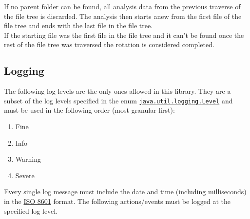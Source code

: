 \documentclass[11pt]{article} %
\begin{document}
    If no parent folder can be found, all analysis data from the previous traverse of the file tree is discarded. The analysis then starts anew from the first file of the file tree and ends with the last file in the file tree.\\
    If the starting file was the first file in the file tree and it can't be found once the rest of the file tree was traversed the rotation is considered completed.


    \subsection{Logging}\label{sec:3.3}

    The following log-levels are the only ones allowed in this library. They are a subset of the log levels specified in the enum \href{https://docs.oracle.com/javase/8/docs/api/java/util/logging/class-use/Level.html}{\texttt{java.util.logging.Level}} and must be used in the following order (most granular first):

    \begin{enumerate}
        \item Fine
        \item Info
        \item Warning
        \item Severe
    \end{enumerate}

    Every single log message must include the date and time (including milliseconds) in the \href{https://en.wikipedia.org/wiki/ISO_8601}{ISO 8601} format. The following actions/events must be logged at the specified log level.
\end{document}
